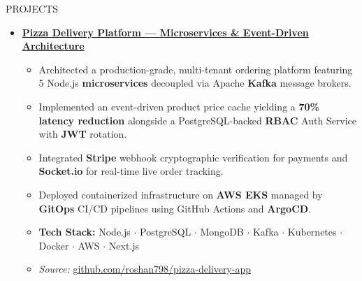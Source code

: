 \documentclass{resume} %
\begin{document}
\begin{rSection}{PROJECTS}
    \vspace{-0.4em}
    \begin{itemize}

        \item \href{https://github.com/roshan798/pizza-delivery-app}{\textbf{Pizza Delivery Platform --- Microservices \& Event-Driven Architecture}}
              \begin{itemize}
                  \itemsep -3pt
                  \item Architected a production-grade, multi-tenant ordering platform featuring 5
                        Node.js \textbf{microservices} decoupled via Apache \textbf{Kafka} message
                        brokers.
                  \item Implemented an event-driven product price cache yielding a \textbf{70\% latency
                            reduction} alongside a PostgreSQL-backed \textbf{RBAC} Auth Service with
                        \textbf{JWT} rotation.
                  \item Integrated \textbf{Stripe} webhook cryptographic verification for payments and
                        \textbf{Socket.io} for real-time live order tracking.
                  \item Deployed containerized infrastructure on \textbf{AWS EKS} managed by
                        \textbf{GitOps} CI/CD pipelines using GitHub Actions and \textbf{ArgoCD}.
                  \item \textbf{Tech Stack:} Node.js $\cdot$ PostgreSQL $\cdot$ MongoDB $\cdot$ Kafka $\cdot$ Kubernetes $\cdot$ Docker $\cdot$ AWS $\cdot$ Next.js
                  \item \textit{Source:} \href{https://github.com/roshan798/pizza-delivery-app}{github.com/roshan798/pizza-delivery-app}
              \end{itemize}


\end{itemize}
\end{rSection}
\end{document}
